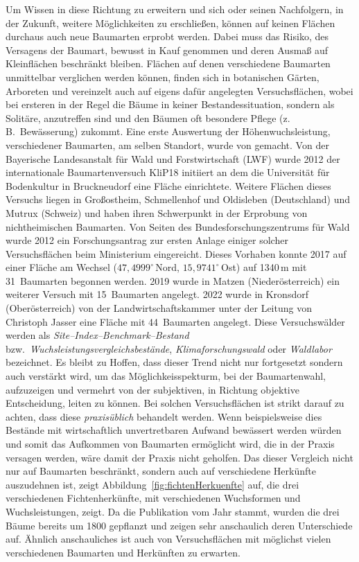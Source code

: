 \documentclass[twocolumn]{scrartcl}
\begin{document}
Um Wissen in diese Richtung zu erweitern und sich oder seinen
Nachfolgern, in der Zukunft, weitere Möglichkeiten zu erschließen,
können auf keinen Flächen durchaus auch neue Baumarten erprobt
werden. Dabei muss das Risiko, des Versagens der Baumart, bewusst in
Kauf genommen und deren Ausmaß auf Kleinflächen beschränkt
bleiben. Flächen auf denen verschiedene Baumarten unmittelbar
verglichen werden können, finden sich in botanischen Gärten, Arboreten
und vereinzelt auch auf eigens dafür angelegten Versuchsflächen, wobei
bei ersteren in der Regel die Bäume in keiner Bestandessituation,
sondern als Solitäre, anzutreffen sind und den Bäumen oft besondere
Pflege (z.\,B.\ Bewässerung) zukommt. Eine erste Auswertung der
Höhenwuchsleistung, verschiedener Baumarten, am selben Standort, wurde
von \cite{mayer1970anbauversuch} gemacht. Von der Bayerische
Landesanstalt für Wald und Forstwirtschaft (LWF) wurde 2012 der
internationale Baumartenversuch KliP18 initiiert an dem die
Universität für Bodenkultur in Bruckneudorf eine Fläche
einrichtete. Weitere Flächen dieses Versuchs liegen in Großostheim,
Schmellenhof und Oldisleben (Deutschland) und Mutrux (Schweiz) und
haben ihren Schwerpunkt in der Erprobung von nichtheimischen
Baumarten. Von Seiten des Bundesforschungszentrums für Wald wurde 2012
ein Forschungsantrag zur ersten Anlage einiger solcher Versuchsflächen
beim Ministerium eingereicht. Dieses Vorhaben konnte 2017 auf einer
Fläche am Wechsel ($47,4999^{\circ}$\,Nord, $15,9741^{\circ}$\,Ost)
auf 1340\,m mit 31~Baumarten begonnen werden. 2019 wurde in Matzen
(Niederösterreich) ein weiterer Versuch mit 15~Baumarten
angelegt. 2022 wurde in Kronsdorf (Oberösterreich) von der
Landwirtschaftskammer unter der Leitung von Christoph Jasser eine
Fläche mit 44~Baumarten angelegt. Diese Versuchswälder werden als
\emph{Site--Index--Benchmark--Bestand} bzw.\
\emph{Wuchsleistungsvergleichsbestände}, \emph{Klimaforschungswald}
oder \emph{Waldlabor} bezeichnet. Es bleibt zu Hoffen, dass dieser
Trend nicht nur fortgesetzt sondern auch verstärkt wird, um das
Möglichkeisspekturm, bei der Baumartenwahl, aufzuzeigen und vermehrt
von der subjektiven, in Richtung objektive Entscheidung, leiten zu
können. Bei solchen Versuchsflächen ist strikt darauf zu achten, dass
diese \emph{praxisüblich} behandelt werden. Wenn beispielsweise dies
Bestände mit wirtschaftlich unvertretbaren Aufwand bewässert werden
würden und somit das Aufkommen von Baumarten ermöglicht wird, die in
der Praxis versagen werden, wäre damit der Praxis nicht geholfen. Das
dieser Vergleich nicht nur auf Baumarten beschränkt, sondern auch auf
verschiedene Herkünfte auszudehnen ist, zeigt
Abbildung~\ref{fig:fichtenHerkuenfte}
\citep[S.~86]{hegi1906IllustrierteFloraBd1} auf, die drei
verschiedenen Fichtenherkünfte, mit verschiedenen Wuchsformen und
Wuchsleistungen, zeigt. Da die Publikation vom Jahr
\citeyear{hegi1906IllustrierteFloraBd1} stammt, wurden die drei Bäume
bereits um 1800 gepflanzt und zeigen sehr anschaulich deren
Unterschiede auf. Ähnlich anschauliches ist auch von Versuchsflächen
mit möglichst vielen verschiedenen Baumarten und Herkünften zu
erwarten.
\end{document}
